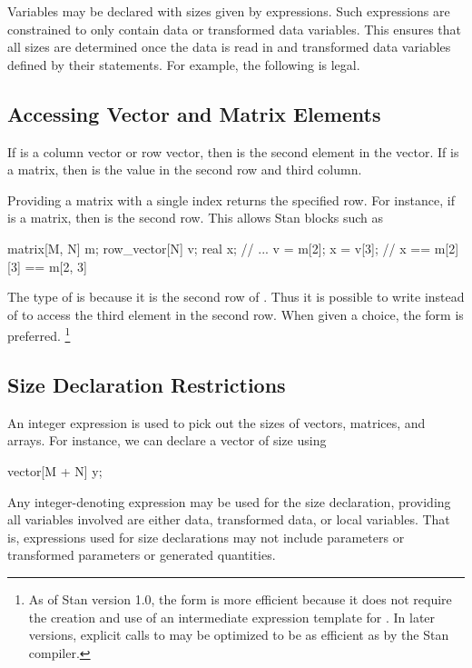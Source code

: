 Variables may be declared with sizes given by expressions.  Such
expressions are constrained to only contain data or transformed data
variables.  This ensures that all sizes are determined once the data
is read in and transformed data variables defined by their statements.
For example, the following is legal.
%
\begin{stancode}
data {
  int<lower=0> N_observed;    int<lower=0> N_missing;
  // ...
transformed parameters {
  vector[N_observed + N_missing] y;
  // ...
\end{stancode}

\subsection{Accessing Vector and Matrix Elements}

If  is a column vector or row vector, then  is the
second element in the vector.  If  is a matrix, then
 is the value in the second row and third column.

Providing a matrix with a single index returns the specified row.  For
instance, if  is a matrix, then  is the second row.
This allows Stan blocks such as
%
\begin{stancode}
matrix[M, N] m;
row_vector[N] v;
real x;
// ...
v = m[2];
x = v[3];   // x == m[2][3] == m[2, 3]
\end{stancode}
%
The type of  is  because it is the second
row of .  Thus it is possible to write  instead
of  to access the third element in the second row.  When
given a choice, the form  is preferred.%
%
\footnote{As of Stan version 1.0, the form
   is more efficient because it does not require the
  creation and use of an intermediate expression template for
  .  In later versions, explicit calls to 
  may be optimized to be as efficient as  by the Stan
  compiler.\label{array-index-style.footnote}}


\subsection{Size Declaration Restrictions}

An integer expression is used to pick out the sizes of vectors,
matrices, and arrays.  For instance, we can declare a vector of size
 using
%
\begin{stancode}
vector[M + N] y;
\end{stancode}
%
Any integer-denoting expression may be used for the size declaration,
providing all variables involved are either data, transformed data, or
local variables.  That is, expressions used for size declarations may
not include parameters or transformed parameters or generated
quantities.

